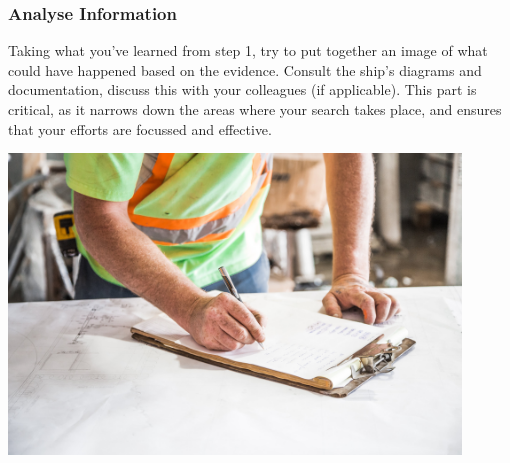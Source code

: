 \documentclass[11pt,a4paper]{article}
\begin{document}
\subsubsection{Analyse Information}
Taking what you've learned from step 1, try to put together an image of what could have happened based on the evidence. Consult the ship's diagrams and documentation, discuss this with your colleagues (if applicable). This part is critical, as it narrows down the areas where your search takes place, and ensures that your efforts are focussed and effective.
\begin{center}
  \includegraphics[width=12cm]{manplan}
\end{center}
\end{document}
